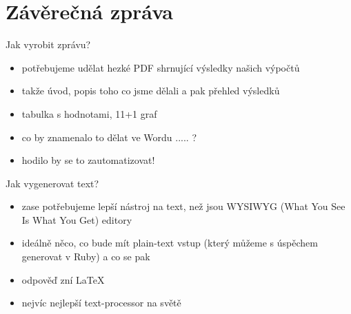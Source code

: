 \documentclass{beamer}
\begin{document}

\section{Závěrečná zpráva}

\begin{frame}{Jak vyrobit zprávu?}
  \begin{itemize}
    \item potřebujeme udělat hezké PDF shrnující výsledky našich výpočtů
    \item takže úvod, popis toho co jsme dělali a pak přehled výsledků
    \item tabulka s hodnotami, 11+1 graf
    \item co by znamenalo to dělat ve Wordu ..... ?
    \item hodilo by se to zautomatizovat!
  \end{itemize}
\end{frame}

\begin{frame}{Jak vygenerovat text?}
  \begin{itemize}
    \item zase potřebujeme lepší nástroj na text, než jsou WYSIWYG (What You See Is What You Get) editory
    \item ideálně něco, co bude mít plain-text vstup (který můžeme s úspěchem generovat v Ruby) a co se pak
    \item odpověď zní \LaTeX
    \item nejvíc nejlepší text-processor na světě
  \end{itemize}
\end{frame}
\end{document}
